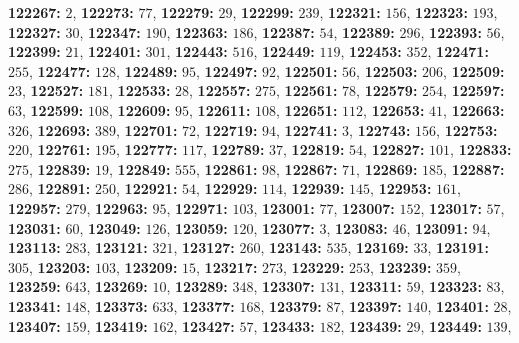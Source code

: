 \textsf{\bfseries 122267:} $2$, \textsf{\bfseries 122273:} $77$, \textsf{\bfseries 122279:} $29$, \textsf{\bfseries 122299:} $239$, \textsf{\bfseries 122321:} $156$, \textsf{\bfseries 122323:} $193$, \textsf{\bfseries 122327:} $30$, \textsf{\bfseries 122347:} $190$, \textsf{\bfseries 122363:} $186$, \textsf{\bfseries 122387:} $54$, \textsf{\bfseries 122389:} $296$, \textsf{\bfseries 122393:} $56$, \textsf{\bfseries 122399:} $21$, \textsf{\bfseries 122401:} $301$, \textsf{\bfseries 122443:} $516$, \textsf{\bfseries 122449:} $119$, \textsf{\bfseries 122453:} $352$, \textsf{\bfseries 122471:} $255$, \textsf{\bfseries 122477:} $128$, \textsf{\bfseries 122489:} $95$, \textsf{\bfseries 122497:} $92$, \textsf{\bfseries 122501:} $56$, \textsf{\bfseries 122503:} $206$, \textsf{\bfseries 122509:} $23$, \textsf{\bfseries 122527:} $181$, \textsf{\bfseries 122533:} $28$, \textsf{\bfseries 122557:} $275$, \textsf{\bfseries 122561:} $78$, \textsf{\bfseries 122579:} $254$, \textsf{\bfseries 122597:} $63$, \textsf{\bfseries 122599:} $108$, \textsf{\bfseries 122609:} $95$, \textsf{\bfseries 122611:} $108$, \textsf{\bfseries 122651:} $112$, \textsf{\bfseries 122653:} $41$, \textsf{\bfseries 122663:} $326$, \textsf{\bfseries 122693:} $389$, \textsf{\bfseries 122701:} $72$, \textsf{\bfseries 122719:} $94$, \textsf{\bfseries 122741:} $3$, \textsf{\bfseries 122743:} $156$, \textsf{\bfseries 122753:} $220$, \textsf{\bfseries 122761:} $195$, \textsf{\bfseries 122777:} $117$, \textsf{\bfseries 122789:} $37$, \textsf{\bfseries 122819:} $54$, \textsf{\bfseries 122827:} $101$, \textsf{\bfseries 122833:} $275$, \textsf{\bfseries 122839:} $19$, \textsf{\bfseries 122849:} $555$, \textsf{\bfseries 122861:} $98$, \textsf{\bfseries 122867:} $71$, \textsf{\bfseries 122869:} $185$, \textsf{\bfseries 122887:} $286$, \textsf{\bfseries 122891:} $250$, \textsf{\bfseries 122921:} $54$, \textsf{\bfseries 122929:} $114$, \textsf{\bfseries 122939:} $145$, \textsf{\bfseries 122953:} $161$, \textsf{\bfseries 122957:} $279$, \textsf{\bfseries 122963:} $95$, \textsf{\bfseries 122971:} $103$, \textsf{\bfseries 123001:} $77$, \textsf{\bfseries 123007:} $152$, \textsf{\bfseries 123017:} $57$, \textsf{\bfseries 123031:} $60$, \textsf{\bfseries 123049:} $126$, \textsf{\bfseries 123059:} $120$, \textsf{\bfseries 123077:} $3$, \textsf{\bfseries 123083:} $46$, \textsf{\bfseries 123091:} $94$, \textsf{\bfseries 123113:} $283$, \textsf{\bfseries 123121:} $321$, \textsf{\bfseries 123127:} $260$, \textsf{\bfseries 123143:} $535$, \textsf{\bfseries 123169:} $33$, \textsf{\bfseries 123191:} $305$, \textsf{\bfseries 123203:} $103$, \textsf{\bfseries 123209:} $15$, \textsf{\bfseries 123217:} $273$, \textsf{\bfseries 123229:} $253$, \textsf{\bfseries 123239:} $359$, \textsf{\bfseries 123259:} $643$, \textsf{\bfseries 123269:} $10$, \textsf{\bfseries 123289:} $348$, \textsf{\bfseries 123307:} $131$, \textsf{\bfseries 123311:} $59$, \textsf{\bfseries 123323:} $83$, \textsf{\bfseries 123341:} $148$, \textsf{\bfseries 123373:} $633$, \textsf{\bfseries 123377:} $168$, \textsf{\bfseries 123379:} $87$, \textsf{\bfseries 123397:} $140$, \textsf{\bfseries 123401:} $28$, \textsf{\bfseries 123407:} $159$, \textsf{\bfseries 123419:} $162$, \textsf{\bfseries 123427:} $57$, \textsf{\bfseries 123433:} $182$, \textsf{\bfseries 123439:} $29$, \textsf{\bfseries 123449:} $139$, 
